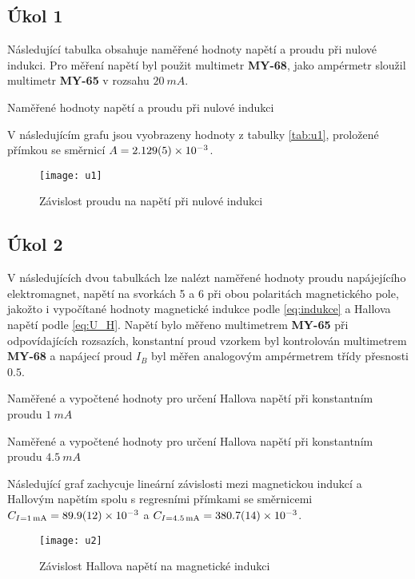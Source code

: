 \documentclass[0-protokol.tex]{subfiles}
\begin{document}
\subsection*{Úkol 1}
Následující tabulka obsahuje naměřené hodnoty napětí a proudu při nulové indukci. Pro měření napětí byl použit multimetr \textbf{MY-68}, jako ampérmetr sloužil multimetr \textbf{MY-65} v rozsahu $\SI{20}{mA}$.
\begin{table}[H] 
\centering
\setlength{\tabcolsep}{10pt}

\caption{Naměřené hodnoty napětí a proudu při nulové indukci}
\label{tab:u1}
\end{table}

V následujícím grafu jsou vyobrazeny hodnoty z tabulky \ref{tab:u1}, proložené přímkou se směrnicí $A = \SI{2.129 \pm 0.005 e-3}{}$. 
\begin{figure}[H]
\centering
\texttt{[image: u1]}
\caption{Závislost proudu na napětí při nulové indukci}
\label{fig:u1}
\end{figure}

\subsection*{Úkol 2}
V následujících dvou tabulkách lze nalézt naměřené hodnoty proudu napájejícího elektromagnet, napětí na svorkách 5 a 6 při obou polaritách magnetického pole, jakožto i vypočítané hodnoty magnetické indukce podle \eqref{eq:indukce} a Hallova napětí podle \eqref{eq:U_H}. Napětí bylo měřeno multimetrem \textbf{MY-65} při odpovídajících rozsazích, konstantní proud vzorkem byl kontrolován multimetrem \textbf{MY-68} a napájecí proud $I_B$ byl měřen analogovým ampérmetrem třídy přesnosti $\num{0,5}$.
\begin{table}[H] \label{tab:u2_1mA}
\centering
\setlength{\tabcolsep}{4pt}

\caption{Naměřené a vypočtené hodnoty pro určení Hallova napětí při konstantním proudu $\SI{1}{mA}$}
\end{table}

\begin{table}[H] \label{tab:u2_4.5mA}
\centering
\setlength{\tabcolsep}{4pt}

\caption{Naměřené a vypočtené hodnoty pro určení Hallova napětí při konstantním proudu $\SI{4.5}{mA}$}
\end{table}

Následující graf zachycuje lineární závislosti mezi magnetickou indukcí a Hallovým napětím spolu s regresními přímkami se směrnicemi $C_{I = \SI{1}{mA}} = \SI{89.9 \pm 1.2 e-3}{}$ a $C_{I = \SI{4.5}{mA}} = \SI{380.7 \pm 1.4 e-3}{}$.
\begin{figure}[H]
\centering
\texttt{[image: u2]}
\caption{Závislost Hallova napětí na magnetické indukci}
\label{fig:u2}
\end{figure}
\end{document}
